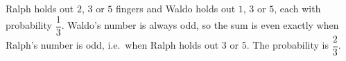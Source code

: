 Ralph holds out $2$, $3$ or $5$ fingers and Waldo holds out $1$, $3$ or $5$, each with probability $\dfrac{1}{3}$. Waldo's number is always odd, so the sum is even exactly when Ralph's number is odd, i.e.\ when Ralph holds out $3$ or $5$. The probability is $\boxed{\dfrac{2}{3}}$.

